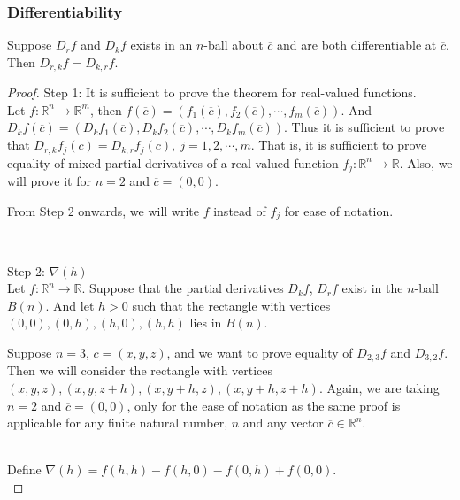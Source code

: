 \subsubsection{Differentiability}
\begin{theorem}
	Suppose $D_r f$ and $D_k f$ exists in an $n$-ball about $\overline{c}$ and are both differentiable at $\overline{c}$. Then $D_{r,k} f = D_{k,r} f$.
\end{theorem}
\begin{proof}
	\par{Step 1:} It is sufficient to prove the theorem for real-valued functions.\\
	
	Let $f : \mathbb{R}^n \to \mathbb{R}^m$, then $f(\overline{c}) = \left( f_1(\overline{c}),f_2(\overline{c}),\cdots,f_m(\overline{c}) \right)$. And $D_k f(\overline{c}) = \left( D_k f_1(\overline{c}), D_k f_2(\overline{c}), \cdots, D_k f_m(\overline{c}) \right).$ Thus it is sufficient to prove that $D_{r,k}f_j(\overline{c}) = D_{k,r}f_j(\overline{c}),\ j = 1,2,\cdots,m$. That is, it is sufficient to prove equality of mixed partial derivatives of a real-valued function $f_j : \mathbb{R}^n \to \mathbb{R}$. Also, we will prove it for $n = 2$ and $\overline{c} = (0,0)$.\begin{commentary} From Step 2 onwards, we will write $f$ instead of $f_j$ for ease of notation. \end{commentary}\\

	\par{Step 2:} $\nabla(h)$\\

	Let $f : \mathbb{R}^n \to \mathbb{R}$. Suppose that the partial derivatives $D_k f$, $D_r f$ exist in the $n$-ball $B(n)$. And let $h > 0$ such that the rectangle with vertices $(0,0), (0,h), (h,0), (h,h)$ lies in $B(n)$.\begin{commentary} Suppose $n=3$, $c = (x,y,z)$, and we want to prove equality of $D_{2,3} f$ and $D_{3,2} f$. Then we will consider the rectangle with vertices $(x,y,z), (x,y,z+h), (x,y+h,z), (x,y+h,z+h)$. Again, we are taking $n=2$ and $\overline{c} = (0,0)$, only for the ease of notation as the same proof is applicable for any finite natural number, $n$ and any vector $\overline{c} \in \mathbb{R}^n$.\end{commentary}\\
	
	Define $\nabla(h) = f(h,h)-f(h,0)-f(0,h)+f(0,0)$.\\
	

\end{proof}
